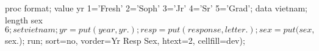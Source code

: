 \begin{listing}
proc format;
   value yr  1='Fresh'  2='Soph'  3='Jr'  4='Sr'  5='Grad';
data vietnam;
   length sex $ 6;
   set vietnam;
   yr = put(year, yr.);
   resp = put(response, letter.);
   sex = put(sex, $sex.);
run;
   sort=no, vorder=Yr Resp Sex, htext=2, cellfill=dev);
\end{listing}
